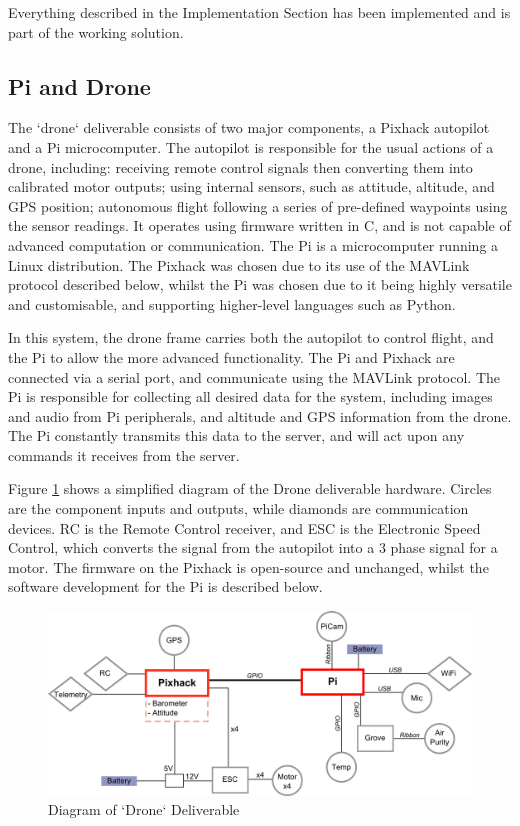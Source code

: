 \documentclass{article}
\begin{document}
 
Everything described in the Implementation Section has been implemented and is part of the working solution. 
 
\subsection{Pi and Drone}
The `drone` deliverable consists of two major components, a Pixhack autopilot and a Pi microcomputer. The autopilot is responsible for the usual actions of a drone, including: receiving remote control signals then converting them into calibrated motor outputs; using internal sensors, such as attitude, altitude, and GPS position; autonomous flight following a series of pre-defined waypoints using the sensor readings. It operates using firmware written in C, and is not capable of advanced computation or communication. The Pi is a microcomputer running a Linux distribution. The Pixhack was chosen due to its use of the MAVLink protocol described below, whilst the Pi was chosen due to it being highly versatile and customisable, and supporting higher-level languages such as Python. 

In this system, the drone frame carries both the autopilot to control flight, and the Pi to allow the more advanced functionality. The Pi and Pixhack are connected via a serial port, and communicate using the MAVLink protocol. The Pi is responsible for collecting all desired data for the system, including images and audio from Pi peripherals, and altitude and GPS information from the drone. The Pi constantly transmits this data to the server, and will act upon any commands it receives from the server.

Figure \ref{fig:DroneDiagram} shows a simplified diagram of the Drone deliverable hardware. Circles are the component inputs and outputs, while diamonds are communication devices. RC is the Remote Control receiver, and ESC is the Electronic Speed Control, which converts the signal from the autopilot into a 3 phase signal for a motor. The firmware on the Pixhack is open-source and unchanged, whilst the software development for the Pi is described below.

\begin{figure}[h]
\centering
\caption{Diagram of `Drone` Deliverable\label{fig:DroneDiagram}}
\includegraphics[width=\textwidth]{DroneDiagram}
\end{figure}
\end{document}
